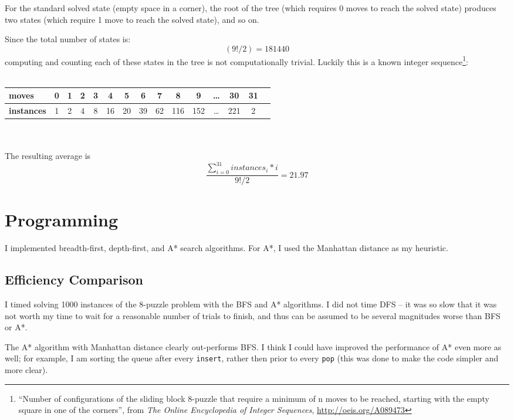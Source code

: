\documentclass{article}
\begin{document}
For the standard solved state (empty space in a corner), the root of the tree
(which requires 0 moves to reach the solved state) produces two states (which
require 1 move to reach the solved state), and so on.

Since the total number of states is:
$$ (9!/2) = 181440 $$
computing and counting each of these states in the tree is not computationally
trivial.  Luckily this is a known integer sequence\footnote{``Number of
configurations of the sliding block 8-puzzle that require a minimum of n moves
to be reached, starting with the empty square in one of the corners'', from
\emph{The Online Encyclopedia of Integer Sequences},
\url{http://oeis.org/A089473}}:
\\\\
\begin{tabular}{|l|c|c|c|c|c|c|c|c|c|c|c|c|c|c|}
\hline
\textbf{moves} & 0 & 1 & 2 & 3 & 4 & 5 & 6 & 7 & 8 & 9 & \dots & 30 & 31 \\
\hline
\textbf{instances} & 1 & 2 & 4 & 8 & 16 & 20 & 39 & 62 & 116 & 152 & \dots & 221 & 2 \\
\hline
\end{tabular}
\\\\

The resulting average is
$$\frac{\displaystyle\sum\limits_{i=0}^{31} instances_{i}*i}{9!/2} = 21.97$$

\section{Programming}

I implemented breadth-first, depth-first, and A* search algorithms. For A*, I
used the Manhattan distance as my heuristic.

\subsection{Efficiency Comparison}
I timed solving 1000 instances of the 8-puzzle problem with the BFS and A*
algorithms. I did not time DFS -- it was so slow that it was not worth my time
to wait for a reasonable number of trials to finish, and thus can be assumed to
be several magnitudes worse than BFS or A*.

The A* algorithm with Manhattan distance clearly out-performs BFS. I think I
could have improved the performance of A* even more as well; for example, I am
sorting the queue after every \texttt{insert}, rather then prior to every
\texttt{pop} (this was done to make the code simpler and more clear).
\end{document}
